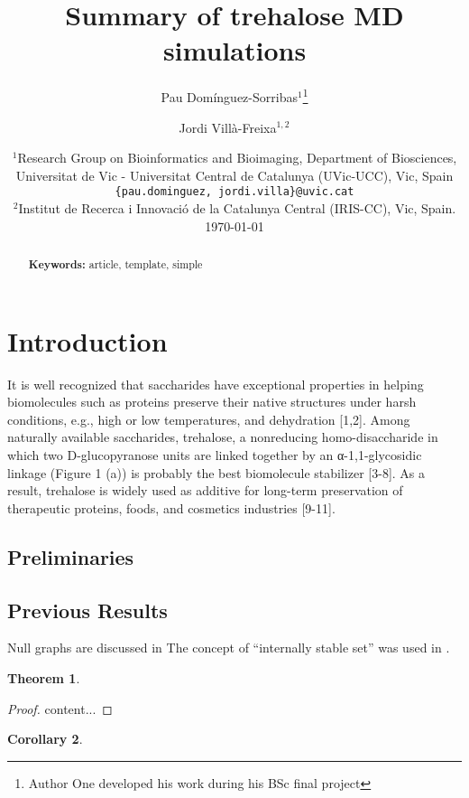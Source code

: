 \documentclass[a4paper]{article}
\title{Summary of trehalose MD simulations}
\author{Pau Domínguez-Sorribas$^1$\thanks{Author One developed his work during his BSc final project} \and Jordi Villà-Freixa$^{1,2}$\orcidlink{0000-0002-6359-3929}}
\date{
	$^1$Research Group on Bioinformatics and Bioimaging, Department of Biosciences, Universitat de Vic - Universitat Central de Catalunya (UVic-UCC), Vic, Spain \\ \texttt{\{pau.dominguez, jordi.villa\}@uvic.cat}\\
	$^2$Institut de Recerca i Innovació de la Catalunya Central (IRIS-CC), Vic, Spain. \\[2ex]%
	\today
}
\theoremstyle{plain}
\newtheorem{theorem}{Theorem}
\newtheorem{corollary}[theorem]{Corollary}
\theoremstyle{definition}
\begin{document}
	\maketitle
	
	\begin{abstract}
		
		
		\noindent\textbf{Keywords:} article, template, simple
	\end{abstract}

	\tableofcontents
	
	\section{Introduction}
	\label{sec:intro}
	
	It is well recognized that saccharides have exceptional properties in helping biomolecules such as proteins preserve their native structures under harsh conditions, e.g., high or low temperatures, and dehydration [1,2]. Among naturally available saccharides, trehalose, a nonreducing homo-disaccharide in which two D-glucopyranose units are linked together by an α-1,1-glycosidic linkage (Figure 1 (a)) is probably the best biomolecule stabilizer [3-8]. As a result, trehalose is widely used as additive for long-term preservation of therapeutic proteins, foods, and cosmetics industries [9-11].
	
	\subsection{Preliminaries}
	\label{sec:pre}
	
	\lipsum[3]
	
	\subsection{Previous Results}
	\label{sec:prev-results}
	
	Null graphs are discussed in \cite{HararyR74}
	The concept of ``internally stable set'' was used in \cite{Berge57, Berge58}.
	
	\begin{theorem}
		\label{thrm:1}
		\lipsum[4]
	\end{theorem}
	\begin{proof}
		content...
	\end{proof}

	\begin{corollary}
	\label{cor:1}
	
	\lipsum[5]
	\end{corollary}
\end{document}
